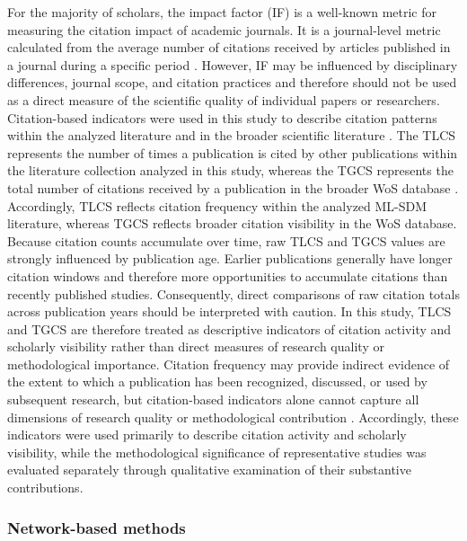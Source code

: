 \documentclass[authoryear,preprint,review,12pt]{elsarticle}
\begin{document}
For the majority of scholars, the impact factor (IF) is a well-known metric for measuring the citation impact of academic journals. It is a journal-level metric calculated from the average number of citations received by articles published in a journal during a specific period \citep{garfield2006history}. However, IF may be influenced by disciplinary differences, journal scope, and citation practices and therefore should not be used as a direct measure of the scientific quality of individual papers or researchers. Citation-based indicators were used in this study to describe citation patterns within the analyzed literature and in the broader scientific literature \citep{mongeon2016journal,moed2005citation}. The TLCS represents the number of times a publication is cited by other publications within the literature collection analyzed in this study, whereas the TGCS represents the total number of citations received by a publication in the broader WoS database \citep{garfield2009science, fan2023data}. Accordingly, TLCS reflects citation frequency within the analyzed ML-SDM literature, whereas TGCS reflects broader citation visibility in the WoS database. Because citation counts accumulate over time, raw TLCS and TGCS values are strongly influenced by publication age. Earlier publications generally have longer citation windows and therefore more opportunities to accumulate citations than recently published studies. Consequently, direct comparisons of raw citation totals across publication years should be interpreted with caution. In this study, TLCS and TGCS are therefore treated as descriptive indicators of citation activity and scholarly visibility rather than direct measures of research quality or methodological importance. Citation frequency may provide indirect evidence of the extent to which a publication has been recognized, discussed, or used by subsequent research, but citation-based indicators alone cannot capture all dimensions of research quality or methodological contribution \citep{aksnes2019citations,hicks2015bibliometrie}. Accordingly, these indicators were used primarily to describe citation activity and scholarly visibility, while the methodological significance of representative studies was evaluated separately through qualitative examination of their substantive contributions.

\subsubsection{Network-based methods}
\end{document}
